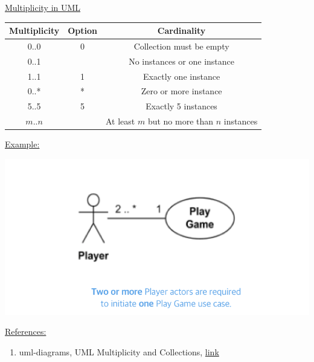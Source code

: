 \documentclass[12pt]{article}
\begin{document}
\begin{enumerate}[1.]
\begin{itemize}
        \bigskip

        \underline{Multiplicity in UML}

        \bigskip

        \begin{center}
            \begin{tabular}{|c|c|c|}
                \hline
                Multiplicity & Option & Cardinality\\
                \hline
                0..0 & 0 & Collection must be empty\\
                \hline
                0..1 & & No instances or one instance\\
                \hline
                1..1 & 1 & Exactly one instance\\
                \hline
                0..* & * & Zero or more instance\\
                \hline
                5..5 & 5 & Exactly 5 instances\\
                \hline
                $m..n$ & & At least $m$ but no more than $n$ instances\\
                \hline
            \end{tabular}
        \end{center}

        \bigskip

        \underline{Example:}

        \begin{center}
        \includegraphics[width=0.7\linewidth]{images/worksheet_15_solution_3.png}
        \end{center}

        \bigskip

        \underline{References:}

        \bigskip

        \begin{enumerate}[1)]
            \item uml-diagrams, UML Multiplicity and Collections, \href{https://www.uml-diagrams.org/multiplicity.html}{link}
        \end{enumerate}


\end{itemize}
\end{enumerate}
\end{document}
